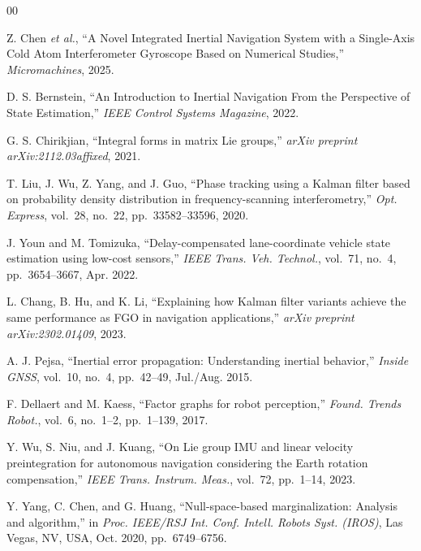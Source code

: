 \documentclass[journal]{IEEEtran}
\begin{document}
	\begin{thebibliography}{00}
        
		Z. Chen \textit{et al.}, ``A Novel Integrated Inertial Navigation System with a Single-Axis Cold Atom Interferometer Gyroscope Based on Numerical Studies,'' \textit{Micromachines}, 2025.
        
		D. S. Bernstein, ``An Introduction to Inertial Navigation From the Perspective of State Estimation,'' \textit{IEEE Control Systems Magazine}, 2022.
        
		G. S. Chirikjian, ``Integral forms in matrix Lie groups,'' \textit{arXiv preprint arXiv:2112.03affixed}, 2021.
        
		T. Liu, J. Wu, Z. Yang, and J. Guo, ``Phase tracking using a Kalman filter based on probability density distribution in frequency-scanning interferometry,'' \textit{Opt. Express}, vol.~28, no.~22, pp.~33582--33596, 2020.
        
		J. Youn and M. Tomizuka, ``Delay-compensated lane-coordinate vehicle state estimation using low-cost sensors,'' \textit{IEEE Trans. Veh. Technol.}, vol.~71, no.~4, pp.~3654--3667, Apr. 2022.
        
		L. Chang, B. Hu, and K. Li, ``Explaining how Kalman filter variants achieve the same performance as FGO in navigation applications,'' \textit{arXiv preprint arXiv:2302.01409}, 2023.
        
		A. J. Pejsa, ``Inertial error propagation: Understanding inertial behavior,'' \textit{Inside GNSS}, vol.~10, no.~4, pp.~42--49, Jul./Aug. 2015.
        
		F. Dellaert and M. Kaess, ``Factor graphs for robot perception,'' \textit{Found. Trends Robot.}, vol.~6, no.~1--2, pp.~1--139, 2017.
        
		Y. Wu, S. Niu, and J. Kuang, ``On Lie group IMU and linear velocity preintegration for autonomous navigation considering the Earth rotation compensation,'' \textit{IEEE Trans. Instrum. Meas.}, vol.~72, pp.~1--14, 2023.
        
		Y. Yang, C. Chen, and G. Huang, ``Null-space-based marginalization: Analysis and algorithm,'' in \textit{Proc. IEEE/RSJ Int. Conf. Intell. Robots Syst. (IROS)}, Las Vegas, NV, USA, Oct. 2020, pp.~6749--6756.
        

\end{thebibliography}
\end{document}

